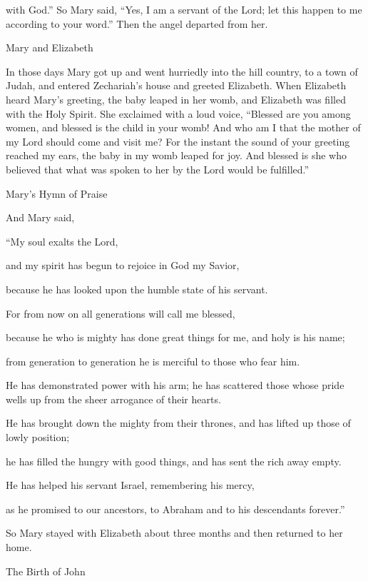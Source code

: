 {with
God.”
So
Mary
said,
“Yes, I am a servant
of the Lord;
let
this happen
to me
according to
your
word.”
Then
the angel
departed
from
her.
\par }{\SH Mary and Elizabeth
\par }{\PP {}In
those
days
Mary
got up
and went
hurriedly
into
the hill country,
to
a town
of Judah,
and
entered
Zechariah’s
house
and
greeted
Elizabeth.
When
Elizabeth
heard
Mary’s
greeting,
the baby
leaped
in
her
womb,
and
Elizabeth
was filled
with the Holy
Spirit.
She exclaimed
with a loud
voice, “Blessed are
you
among
women,
and
blessed is
the child
in your
womb!
And
who
am I
that
the mother
of my
Lord
should come
and visit
me?
For
the instant
the sound
of your
greeting
reached
my
ears,
the baby
in
my
womb
leaped
for
joy.
And
blessed
is she who believed
that
what was spoken
to her
by
the Lord
would be
fulfilled.”
\par }{\SH Mary’s Hymn of Praise
\par }{\PP {}And
Mary
said,
\par }{\Q “My
soul
exalts
the Lord,
\par }{\Q {}and
my
spirit
has begun to rejoice
in
God
my
Savior,
\par }{\Q {}because
he has looked
upon
the humble state
of his
servant.
\par }{\Q For
from
now on
all
generations
will call
me
blessed,
\par }{\Q {}because
he who is mighty
has done
great things
for me,
and
holy
is his
name;
\par }{\Q {}from generation
to
generation
he is merciful
to those who fear
him.
\par }{\Q {}He has demonstrated
power
with
his
arm;
he has scattered
those whose pride
wells up from the sheer
arrogance of their
hearts.
\par }{\Q {}He has brought down
the mighty
from
their thrones,
and
has lifted up
those of lowly position;
\par }{\Q {}he has filled
the hungry
with good things,
and
has sent
the rich
away
empty.
\par }{\Q {}He has helped
his
servant
Israel,
remembering
his mercy,
\par }{\Q {}as
he promised
to
our
ancestors,
to Abraham
and
to his
descendants
forever.”
\par }{\PP {}So
Mary
stayed
with
Elizabeth
about
three
months
and
then returned
to
her
home.
\par }{\SH The Birth of John
}

